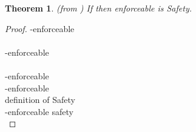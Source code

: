 \documentclass[12pt]{article}
\newtheorem{thm}{Theorem}
\begin{document}
\setcounter{thm}{3}



\begin{thm}
(from \cite{enforceable}) If  then enforceable is  Safety.
\end{thm}
\begin{proof}
-enforceable \\

\hspace*{\fill}\\

-enforceable\\

\hspace*{\fill}\\

-enforceable\\


-enforceable\\

\hspace*{\fill} definition of Safety \\

-enforceable safety \\
\end{proof}


\begin{comment}
\begin{proof}
All actions are O or D, nonuniform context. monitor cannot suppress an action and continue the execution. Similar to theorem 5.
-enforceable \\


\hspace*{\fill}\\

-enforceable \\

\hspace*{\fill}\\

-enforceable \\
\end{proof}
\end{comment}
\end{document}
